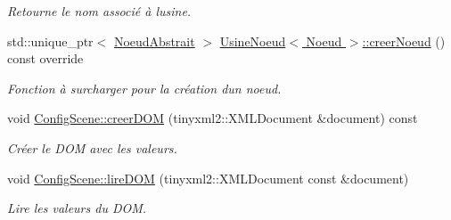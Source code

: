 \begin{DoxyCompactItemize}
\begin{DoxyCompactList}\small\item\em Retourne le nom associé à l\textquotesingle{}usine. \end{DoxyCompactList}\item 
std\+::unique\+\_\+ptr$<$ \hyperlink{class_noeud_abstrait}{Noeud\+Abstrait} $>$ \hyperlink{group__inf2990_gaffd84653b96be43050e5dd25fff10751}{Usine\+Noeud$<$ Noeud $>$\+::creer\+Noeud} () const  override
\begin{DoxyCompactList}\small\item\em Fonction à surcharger pour la création d\textquotesingle{}un noeud. \end{DoxyCompactList}\item 
void \hyperlink{group__inf2990_ga3d0152df0c8c134ecd1a1741302db839}{Config\+Scene\+::creer\+D\+O\+M} (tinyxml2\+::\+X\+M\+L\+Document \&document) const 
\begin{DoxyCompactList}\small\item\em Créer le D\+O\+M avec les valeurs. \end{DoxyCompactList}\item 
void \hyperlink{group__inf2990_gaeacd60be947ce76a1302f6bbb40c90b1}{Config\+Scene\+::lire\+D\+O\+M} (tinyxml2\+::\+X\+M\+L\+Document const \&document)
\begin{DoxyCompactList}\small\item\em Lire les valeurs du D\+O\+M. \end{DoxyCompactList}\end{DoxyCompactItemize}
